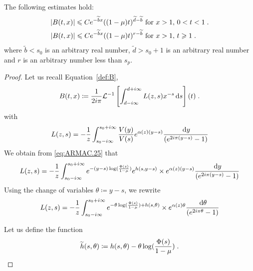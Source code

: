 \begin{lemma} The following estimates hold:
    \begin{align*}
        |B(t,x)| \leqslant  C e^{-\widetilde b x} ((1-\mu)t)^{\widetilde d - \widetilde b} 
        & \text{ for } x > 1, \, 0 < t < 1 \; .  \\
        |B(t,x)| \leqslant  C e^{-\widetilde b x} ((1-\mu)t)^{r - \widetilde b} 
        & \text{ for } x > 1, \, t \geqslant 1 \; . 
    \end{align*}
    where $\tilde b < s_0$ is an arbitrary real number, $\tilde d > s_0 +1$ is an arbitrary real number and $r$ is an arbitrary number less than $s_p$. 
\end{lemma}
\begin{proof}
    Let us recall Equation~\eqref{def:B},  
    \begin{equation*}
        B(t,x) \coloneqq \frac{1}{2i\pi} \mathcal{L}^{-1}\left[\int_{d-i\infty}^{d+i\infty} L(z,s)x^{-s}\,\mathrm{d} s \right] (t)
        \; .
    \end{equation*}
with 
\begin{equation*}
    L(z,s) 
    = 
   - \frac{1}{z}\int_{s_0-i\infty}^{s_0+i\infty} \frac{V(y)}{V(s)} e^{ \alpha(z)(y-s)}
   \frac{\,\mathrm{d} y}{(e^{2i\pi(y-s)}-1)}
\end{equation*}
We obtain from \eqref{eq:ARMAC.25} that 
\begin{equation*}
    L(z,s) 
    = 
   - \frac{1}{z}\int_{s_0-i\infty}^{s_0+i\infty} e^{-(y-s) \log(\frac{\Phi(s)}{1-\mu})}e^{h(s, y-s)} \times e^{ \alpha(z)(y-s)}
   \frac{\,\mathrm{d} y}{(e^{2i\pi(y-s)}-1)}
\end{equation*}
Using the change of variables $\theta \coloneqq y-s$, we rewrite 
\begin{equation*}
    L(z,s) 
    = 
   - \frac{1}{z}\int_{s_0-i\infty}^{s_0+i\infty} e^{-\theta\log(\frac{\Phi(s)}{1-\mu})+ h(s, \theta)} \times e^{ \alpha(z)\theta}
   \frac{\,\mathrm{d} \theta}{(e^{2i\pi\theta}-1)}
\end{equation*}

Let us define the function
    \begin{equation*}
        \widetilde h(s, \theta) \coloneqq h(s, \theta) -\theta\log(\frac{\Phi(s)}{1-\mu})
        \; .
    \end{equation*}


\end{proof}
